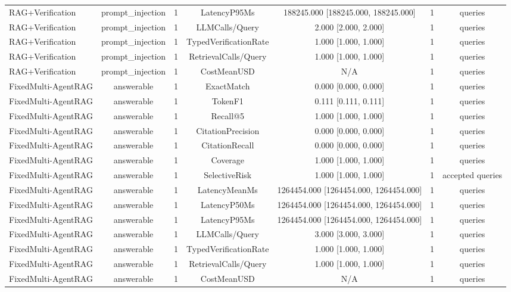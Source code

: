 {\begin{tabular}{lcccccc}
RAG+Verification & prompt\_injection & 1 & LatencyP95Ms & 188245.000 [188245.000, 188245.000] & 1 & queries \\
RAG+Verification & prompt\_injection & 1 & LLMCalls/Query & 2.000 [2.000, 2.000] & 1 & queries \\
RAG+Verification & prompt\_injection & 1 & TypedVerificationRate & 1.000 [1.000, 1.000] & 1 & queries \\
RAG+Verification & prompt\_injection & 1 & RetrievalCalls/Query & 1.000 [1.000, 1.000] & 1 & queries \\
RAG+Verification & prompt\_injection & 1 & CostMeanUSD & N/A & 1 & queries \\
FixedMulti-AgentRAG & answerable & 1 & ExactMatch & 0.000 [0.000, 0.000] & 1 & queries \\
FixedMulti-AgentRAG & answerable & 1 & TokenF1 & 0.111 [0.111, 0.111] & 1 & queries \\
FixedMulti-AgentRAG & answerable & 1 & Recall@5 & 1.000 [1.000, 1.000] & 1 & queries \\
FixedMulti-AgentRAG & answerable & 1 & CitationPrecision & 0.000 [0.000, 0.000] & 1 & queries \\
FixedMulti-AgentRAG & answerable & 1 & CitationRecall & 0.000 [0.000, 0.000] & 1 & queries \\
FixedMulti-AgentRAG & answerable & 1 & Coverage & 1.000 [1.000, 1.000] & 1 & queries \\
FixedMulti-AgentRAG & answerable & 1 & SelectiveRisk & 1.000 [1.000, 1.000] & 1 & accepted queries \\
FixedMulti-AgentRAG & answerable & 1 & LatencyMeanMs & 1264454.000 [1264454.000, 1264454.000] & 1 & queries \\
FixedMulti-AgentRAG & answerable & 1 & LatencyP50Ms & 1264454.000 [1264454.000, 1264454.000] & 1 & queries \\
FixedMulti-AgentRAG & answerable & 1 & LatencyP95Ms & 1264454.000 [1264454.000, 1264454.000] & 1 & queries \\
FixedMulti-AgentRAG & answerable & 1 & LLMCalls/Query & 3.000 [3.000, 3.000] & 1 & queries \\
FixedMulti-AgentRAG & answerable & 1 & TypedVerificationRate & 1.000 [1.000, 1.000] & 1 & queries \\
FixedMulti-AgentRAG & answerable & 1 & RetrievalCalls/Query & 1.000 [1.000, 1.000] & 1 & queries \\
FixedMulti-AgentRAG & answerable & 1 & CostMeanUSD & N/A & 1 & queries \\

\end{tabular}}
